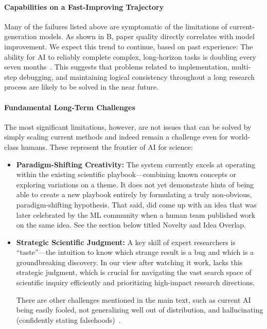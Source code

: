 \begin{appendices}
\paragraph{Capabilities on a Fast-Improving Trajectory}
Many of the failures listed above are symptomatic of the limitations of current-generation models. As shown in B, paper quality directly correlates with model improvement. We expect this trend to continue, based on past experience: The ability for AI to reliably complete complex, long-horizon tasks is doubling every seven months~\citep{metr2025longtasks}. This suggests that problems related to implementation, multi-step debugging, and maintaining logical consistency throughout a long research process are likely to be solved in the near future.

\paragraph{Fundamental Long-Term Challenges}
The most significant limitations, however, are not issues that can be solved by simply scaling current methods and indeed remain a challenge even for world-class humans. These represent the frontier of AI for science:
\begin{itemize}
    \item \textbf{Paradigm-Shifting Creativity:} The system currently excels at operating within the existing scientific playbook---combining known concepts or exploring variations on a theme. It does not yet demonstrate hints of being able to create a new playbook entirely by formulating a truly non-obvious, paradigm-shifting hypothesis. That said, \ouralgo did come up with an idea that was later celebrated by the ML community when a human team published work on the same idea. See the section below titled Novelty and Idea Overlap.\\

    \item \textbf{Strategic Scientific Judgment:} A key skill of expert researchers is ``taste''---the intuition to know which strange result is a bug and which is a groundbreaking discovery. In our view after watching it work, \ouralgo lacks this strategic judgment, which is crucial for navigating the vast search space of scientific inquiry efficiently and prioritizing high-impact research directions.

There are other challenges mentioned in the main text, such as current AI being easily fooled, not generalizing well out of distribution, and hallucinating (confidently stating falsehoods)~\citep{nguyen2015deep,Huang2025HallucinationSurvey,McCoy2024Embers}.


\end{itemize}
\end{appendices}
